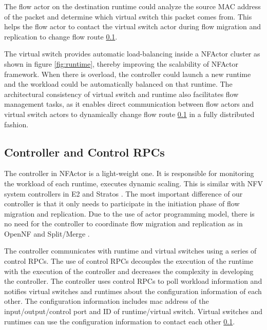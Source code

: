 The flow actor on the destination runtime could analyze the source MAC address of the packet and determine which virtual switch this packet comes from. This helps the flow actor to contact the virtual switch actor during flow migration and replication to change flow route \ref{}.

The virtual switch provides automatic load-balancing inside a NFActor cluster as shown in figure \ref{fig:runtime}, thereby improving the scalability of NFActor framework. When there is overload, the controller could launch a new runtime and the workload could be automatically balanced on that runtime. The architectural consistency of virtual switch and runtime also facilitates flow management tasks, as it enables direct communication between flow actors and virtual switch actors to dynamically change flow route \ref{} in a fully distributed fashion.

\subsection{Controller and Control RPCs}


The controller in NFActor is a light-weight one. It is responsible for monitoring the workload of each runtime, executes dynamic scaling. This is similar with NFV system controllers in E2 \cite{palkar2015e2} and Stratos \cite{gember2012stratos}. The most important difference of our controller is that it only needs to participate in the initiation phase of flow migration and replication. Due to the use of actor programming model, there is no need for the controller to coordinate flow migration and replication as in OpenNF \cite{gember2015opennf} and Split/Merge \cite{rajagopalan2013split}.

The controller communicates with runtime and virtual switches using a series of control RPCs. The use of control RPCs decouples the execution of the runtime with the execution of the controller and decreases the complexity in developing the controller. The controller uses control RPCs to poll workload information and notifies virtual switches and runtimes about the configuration information of each other. The configuration information includes mac address of the input/output/control port and ID of runtime/virtual switch. Virtual switches and runtimes can use the configuration information to contact each other \ref{}.

